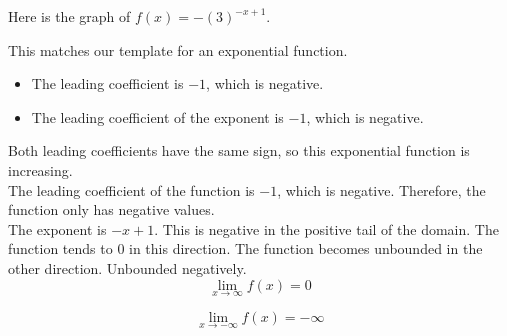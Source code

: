 \documentclass{ximera}
\begin{document}
\begin{example}



Here is the graph of $f(x) = -\left( 3 \right)^{-x + 1}$.

\begin{image}
\end{image}



This matches our template for an exponential function. \\


\begin{itemize}
  \item The leading coefficient is $-1$, which is negative. 
  \item The leading coefficient of the exponent is $-1$, which is negative. 
\end{itemize}

Both leading coefficients have the same sign, so this exponential function is increasing. \\



The leading coefficient of the function is $-1$, which is negative. Therefore, the function only has negative values. \\


The exponent is $-x+1$.  This is negative in the positive tail of the domain. The function tends to $0$ in this direction. The function becomes unbounded in the other direction. Unbounded negatively. \\




\[
\lim\limits_{x \to \infty} f(x) = 0 
\]


\[
\lim\limits_{x \to -\infty} f(x) = -\infty 
\]

\end{example}
\end{document}
